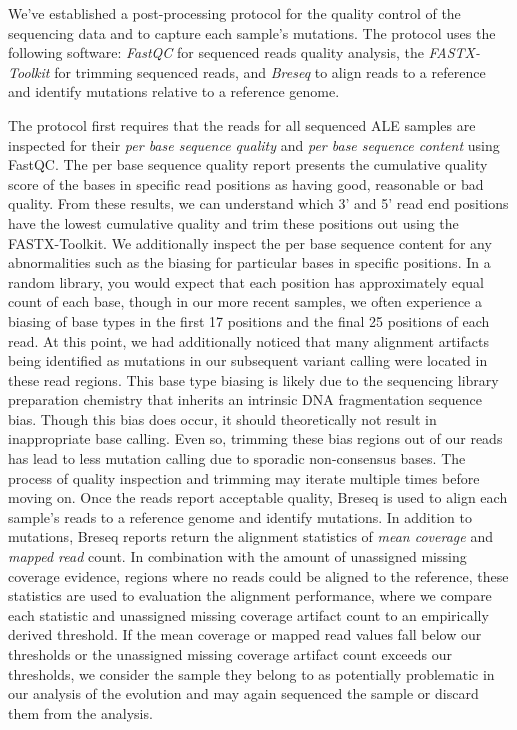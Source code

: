 \documentclass[12pt,final,masters,chapterheads]{ucsd}  %
\begin{document}
We've established a post-processing protocol for the quality control of the sequencing data and to capture each sample's mutations. The protocol uses the following software: \textit{FastQC} \cite{Andrew:2010:Online} for sequenced reads quality analysis, the \textit{FASTX-Toolkit} \cite{FASTX-Toolkit} for trimming sequenced reads, and \textit{Breseq} \cite{breseq_paper} to align reads to a reference and identify mutations relative to a reference genome.

The protocol first requires that the reads for all sequenced ALE samples are inspected for their \textit{per base sequence quality} and \textit{per base sequence content} using FastQC. The per base sequence quality report presents the cumulative quality score of the bases in specific read positions as having good, reasonable or bad quality. From these results, we can understand which 3' and 5' read end positions have the lowest cumulative quality and trim these positions out using the FASTX-Toolkit. We additionally inspect the per base sequence content for any abnormalities such as the biasing for particular bases in specific positions. In a random library, you would expect that each position has approximately equal count of each base, though in our more recent samples, we often experience a biasing of base types in the first 17 positions and the final 25 positions of each read. At this point, we had additionally noticed that many alignment artifacts being identified as mutations in our subsequent variant calling were located in these read regions. This base type biasing is likely due to the sequencing library preparation chemistry that inherits an intrinsic DNA fragmentation sequence bias. Though this bias does occur, it should theoretically not result in inappropriate base calling. Even so, trimming these bias regions out of our reads has lead to less mutation calling due to sporadic non-consensus bases. The process of quality inspection and trimming may iterate multiple times before moving on. Once the reads report acceptable quality, Breseq is used to align each sample's reads to a reference genome and identify mutations. In addition to mutations, Breseq reports return the alignment statistics of \textit{mean coverage} and \textit{mapped read} count. In combination with the amount of unassigned missing coverage evidence, regions where no reads could be aligned to the reference, these statistics are used to evaluation the alignment performance, where we compare each statistic and unassigned missing coverage artifact count to an empirically derived threshold. If the mean coverage or mapped read values fall below our thresholds or the unassigned missing coverage artifact count exceeds our thresholds, we consider the sample they belong to as potentially problematic in our analysis of the evolution and may again sequenced the sample or discard them from the analysis.
\end{document}
